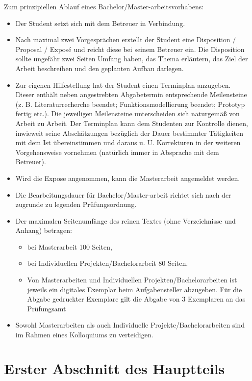 \documentclass[11pt]{scrartcl}
\begin{document}
Zum prinzipiellen Ablauf eines Bachelor/Master-arbeitsvorhabens:

\begin{itemize}
  \item Der Student setzt sich mit dem Betreuer in Verbindung.
  \item Nach maximal zwei Vorgesprächen erstellt der Student eine Disposition / Proposal / Exposé und reicht diese bei seinem Betreuer ein. Die Disposition sollte ungefähr zwei Seiten Umfang haben, das Thema erläutern, das Ziel der Arbeit beschreiben und den geplanten Aufbau darlegen.
  \item Zur eigenen Hilfestellung hat der Student einen Terminplan anzugeben. Dieser enthält neben angestrebten Abgabetermin entsprechende Meilensteine (z. B. Literaturrecherche beendet; Funktionsmodellierung beendet; Prototyp fertig etc.). Die jeweiligen Meilensteine unterscheiden sich naturgemäß von Arbeit zu Arbeit. Der Terminplan kann dem Studenten zur Kontrolle dienen, inwieweit seine Abschätzungen bezüglich der Dauer bestimmter Tätigkeiten mit dem Ist übereinstimmen und daraus u. U. Korrekturen in der weiteren Vorgehensweise vornehmen (natürlich immer in Absprache mit dem Betreuer).
  \item Wird die Expose angenommen, kann die Masterarbeit angemeldet werden.
  \item Die Bearbeitungsdauer für Bachelor/Master-arbeit  richtet sich nach der zugrunde zu legenden Prüfungsordnung.
  \item Der maximalen Seitenumfänge des reinen Textes (ohne Verzeichnisse und Anhang) betragen:
  \begin{itemize}
    \item bei Masterarbeit 100 Seiten,
    \item bei Individuellen Projekten/Bachelorarbeit 80 Seiten.
    \item Von Masterarbeiten und Individuellen Projekten/Bachelorarbeiten ist jeweils ein digitales Exemplar beim Aufgabensteller abzugeben. Für die Abgabe gedruckter Exemplare gilt die Abgabe von 3 Exemplaren an das Prüfungsamt
  \end{itemize}
  \item Sowohl Masterarbeiten als auch Individuelle Projekte/Bachelorarbeiten sind im Rahmen eines Kolloquiums zu verteidigen.
\end{itemize}
  

\section{Erster Abschnitt des Hauptteils}
\end{document}
